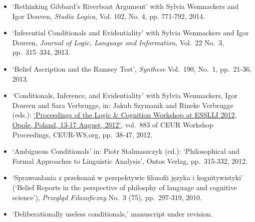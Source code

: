 \documentclass[a4paper,12pt]{article}
\begin{document}
\begin{small}
\begin{itemize}

  \end{itemize}


  \begin{itemize}
    \item `Rethinking Gibbard's Riverboat Argument' with Sylvia Wenmackers and Igor Douven, \emph{Studia Logica}, Vol. 102, No. 4, pp. 771-792, 2014.

    \item `Inferential Conditionals and Evidentiality' with Sylvia Wenmackers and Igor Douven, \emph{Journal of Logic, Language and Information}, Vol.~22 No.~3, pp.~315–334, 2013.

    \item `Belief Ascription and the Ramsey Test', \emph{Synthese} Vol.~190, No.~1, pp.~21-36, 2013. %

    \item `Conditionals, Inference, and Evidentiality' with Sylvia Wenmackers, Igor Douven and Sara Verbrugge, in: Jakub Szymanik and Rineke Verbrugge (eds.): \href{http://ceur-ws.org/Vol-883/}{`Proceedings of the Logic \& Cognition Workshop at ESSLLI 2012, Opole, Poland, 13-17 August, 2012'}, vol.~883 of CEUR Workshop Proceedings, CEUR-WS.org, pp.~38-47, 2012.

    \item `Ambiguous Conditionals' in: Piotr Stalmaszczyk (ed.): `Philosophical and Formal Approaches to Linguistic Analysis', Ontos Verlag, pp.~315-332, 2012.

    \item `Sprawozdania z przekonań w perspektywie filozofii języka i kognitywistyki' (`Belief Reports in the perspective of philosphy of language and cognitive science'), \emph{Przegląd Filozoficzny} No.~3 (75), pp.~297-319, 2010.

  \end{itemize}

  \begin{itemize}
   \item `Deliberationally useless conditionals,' manuscript under revision.
    

\end{itemize}
\end{small}
\end{document}
